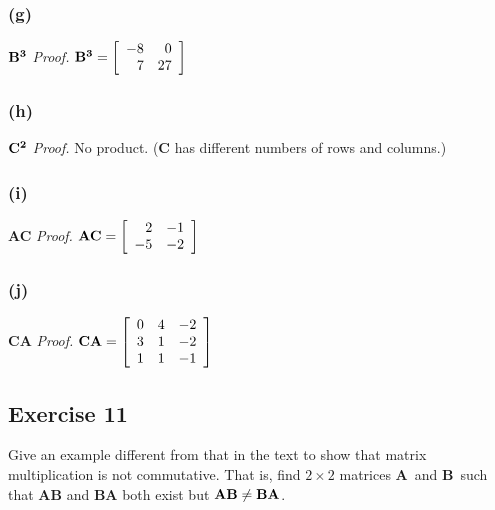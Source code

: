 \documentclass[14pt]{extarticle}
\begin{document}
\subsubsection{(g)}
\({\bf B^3}\)\hspace{3cm}
{\it Proof.}
\({\bf B^3} =
\left[
    \begin{array}{rr}
        -8 & 0  \\
        7  & 27 \\
    \end{array}
    \right]
\)

\subsubsection{(h)}
\({\bf C^2}\)\hspace{3cm}
{\it Proof.} No product. ({\bf C} has different numbers of rows and columns.)

\subsubsection{(i)}
{\bf AC}\hspace{3cm}
{\it Proof.}
\({\bf AC} =
\left[
    \begin{array}{rr}
        2  & -1 \\
        -5 & -2 \\
    \end{array}
    \right]
\)

\subsubsection{(j)}
{\bf CA}\hspace{3cm}
{\it Proof.}
\({\bf CA} =
\left[
    \begin{array}{rrr}
        0 & 4 & -2 \\
        3 & 1 & -2 \\
        1 & 1 & -1 \\
    \end{array}
    \right]
\)

\subsection{Exercise 11}
Give an example different from that in the text to show that matrix multiplication is not commutative. That is, find
\(2 \times 2\) matrices {\bf A}\, and {\bf B}\, such that {\bf AB} and {\bf BA} both exist but \({\bf AB} \neq {\bf BA}\).
\end{document}

